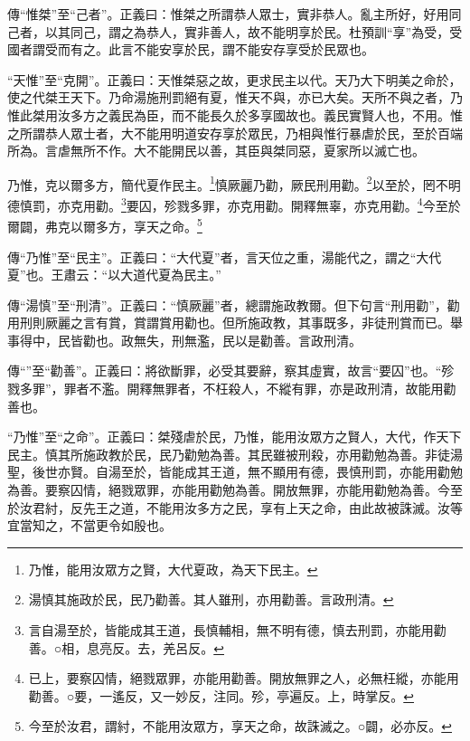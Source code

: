 {\noindent\zhuan{}\fzbyks 傳“惟桀”至“己者”。正義曰：惟桀之所謂恭人眾士，實非恭人。亂主所好，好用同己者，以其同己，謂之為恭人，實非善人，故不能明享於民。杜預訓“享”為受，受國者謂受而有之。此言不能安享於民，謂不能安存享受於民眾也。 \par}

{\noindent\shu{}\fzkt “天惟”至“克開”。正義曰：天惟桀惡之故，更求民主以代。天乃大下明美之命於，使之代桀王天下。乃命湯施刑罰絕有夏，惟天不與，亦已大矣。天所不與之者，乃惟此桀用汝多方之義民為臣，而不能長久於多享國故也。義民實賢人也，不用。惟之所謂恭人眾士者，大不能用明道安存享於眾民，乃相與惟行暴虐於民，至於百端所為。言虐無所不作。大不能開民以善，其臣與桀同惡，夏家所以滅亡也。 \par}

乃惟，克以爾多方，簡代夏作民主。\footnote{乃惟，能用汝眾方之賢，大代夏政，為天下民主。}慎厥麗乃勸，厥民刑用勸。\footnote{湯慎其施政於民，民乃勸善。其人雖刑，亦用勸善。言政刑清。}以至於，罔不明德慎罰，亦克用勸。\footnote{言自湯至於，皆能成其王道，長慎輔相，無不明有德，慎去刑罰，亦能用勸善。○相，息亮反。去，羌呂反。}要囚，殄戮多罪，亦克用勸。開釋無辜，亦克用勸。\footnote{已上，要察囚情，絕戮眾罪，亦能用勸善。開放無罪之人，必無枉縱，亦能用勸善。○要，一遙反，又一妙反，注同。殄，亭遍反。上，時掌反。}今至於爾闢，弗克以爾多方，享天之命。\footnote{今至於汝君，謂紂，不能用汝眾方，享天之命，故誅滅之。○闢，必亦反。}


{\noindent\zhuan{}\fzbyks 傳“乃惟”至“民主”。正義曰：“大代夏”者，言天位之重，湯能代之，謂之“大代夏”也。王肅云：“以大道代夏為民主。” \par}

{\noindent\zhuan{}\fzbyks 傳“湯慎”至“刑清”。正義曰：“慎厥麗”者，總謂施政教爾。但下句言“刑用勸”，勸用刑則厥麗之言有賞，賞謂賞用勸也。但所施政教，其事既多，非徒刑賞而已。舉事得中，民皆勸也。政無失，刑無濫，民以是勸善。言政刑清。 \par}

{\noindent\zhuan{}\fzbyks 傳“”至“勸善”。正義曰：將欲斷罪，必受其要辭，察其虛實，故言“要囚”也。“殄戮多罪”，罪者不濫。開釋無罪者，不枉殺人，不縱有罪，亦是政刑清，故能用勸善也。 \par}

{\noindent\shu{}\fzkt “乃惟”至“之命”。正義曰：桀殘虐於民，乃惟，能用汝眾方之賢人，大代，作天下民主。慎其所施政教於民，民乃勸勉為善。其民雖被刑殺，亦用勸勉為善。非徒湯聖，後世亦賢。自湯至於，皆能成其王道，無不顯用有德，畏慎刑罰，亦能用勸勉為善。要察囚情，絕戮眾罪，亦能用勸勉為善。開放無罪，亦能用勸勉為善。今至於汝君紂，反先王之道，不能用汝多方之民，享有上天之命，由此故被誅滅。汝等宜當知之，不當更令如殷也。 \par}

